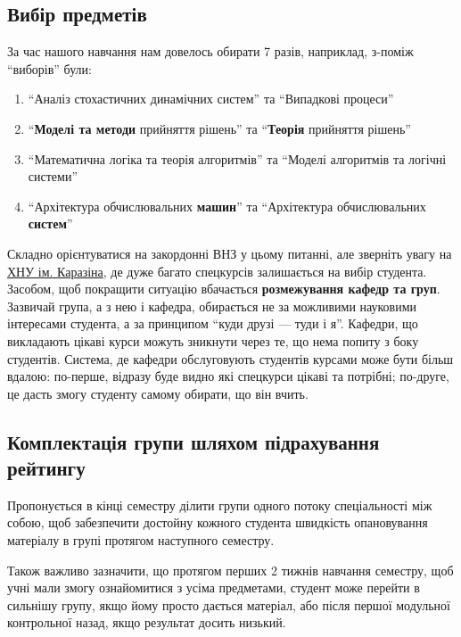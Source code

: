 \documentclass[14pt, a4paper]{extarticle}  %
\begin{document}
\subsection{Вибір предметів}
\label{real_choice}
За час нашого навчання нам довелось обирати 7 разів, наприклад, з-поміж ``виборів'' були:
\begin{enumerate}
    \item ``Аналіз стохастичних динамічних систем'' та ``Випадкові процеси''
    \item ``\textbf{Моделі та методи} прийняття рішень'' та ``\textbf{Теорія} прийняття рішень''
    \item  ``Математична логіка та теорія алгоритмів'' та ``Моделі алгоритмів та логічні системи''
    \item ``Архітектура обчислювальних \textbf{машин}'' та ``Архітектура обчислювальних \textbf{систем}''
\end{enumerate}

Складно орієнтуватися на закордонні ВНЗ у цьому питанні, але зверніть увагу на \href{http://appmath.univer.kharkov.ua/courses_new.html}{ХНУ ім. Каразіна}, де дуже багато спецкурсів залишається на вибір студента. %
\medskip
Засобом, щоб покращити ситуацію вбачається \textbf{розмежування кафедр та груп}. Зазвичай група, а з нею і кафедра, обирається не за можливими науковими інтересами студента, а за принципом ``куди друзі --- туди і я''. Кафедри, що викладають цікаві курси можуть зникнути через те, що нема попиту з боку студентів. Система, де кафедри обслуговують студентів курсами може бути більш вдалою: по-перше, відразу буде видно які спецкурси цікаві та потрібні; по-друге, це дасть змогу студенту самому обирати, що він вчить. 

\subsection{Комплектація групи шляхом підрахування рейтингу}
Пропонується в кінці семестру ділити групи одного потоку спеціальності між собою, щоб забезпечити достойну кожного студента швидкість опановування матеріалу в групі протягом наступного семестру. 

Також важливо зазначити, що протягом перших 2 тижнів навчання семестру,  щоб учні мали змогу ознайомитися з усіма предметами, студент може перейти в сильнішу групу, якщо йому просто дається матеріал, або після першої модульної контрольної назад, якщо результат досить низький.
\end{document}
